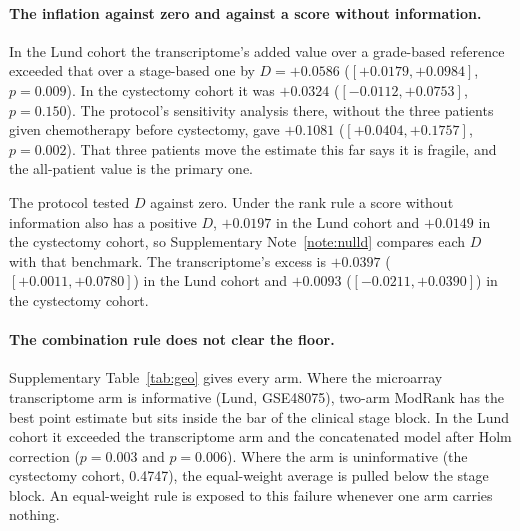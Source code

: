 \documentclass[11pt]{article}
\begin{document}
\paragraph{The inflation against zero and against a score without information.} In the Lund cohort
the transcriptome's added value over a grade-based reference exceeded that over a stage-based one by
$D=+0.0586$ ($[+0.0179, +0.0984]$, $p=0.009$). In the cystectomy cohort it was $+0.0324$
($[-0.0112, +0.0753]$, $p=0.150$). The protocol's sensitivity analysis there, without the three
patients given chemotherapy before cystectomy, gave $+0.1081$ ($[+0.0404, +0.1757]$, $p=0.002$).
That three patients move the estimate this far says it is fragile, and the all-patient value is the
primary one.

The protocol tested $D$ against zero. Under the rank rule a score without information
also has a positive $D$, $+0.0197$ in the Lund cohort and $+0.0149$ in the cystectomy cohort, so
Supplementary Note~\ref{note:nulld} compares each $D$ with that benchmark. The transcriptome's excess
is $+0.0397$ ($[+0.0011, +0.0780]$) in the Lund cohort and $+0.0093$ ($[-0.0211, +0.0390]$) in the
cystectomy cohort.

\paragraph{The combination rule does not clear the floor.} Supplementary Table~\ref{tab:geo} gives
every arm. Where the microarray transcriptome arm is informative (Lund, GSE48075), two-arm ModRank has
the best point estimate but sits inside the bar of the clinical stage block. In the Lund cohort it
exceeded the transcriptome arm and the concatenated model after Holm correction ($p=0.003$ and $p=0.006$).
Where the arm is uninformative (the cystectomy cohort, 0.4747), the equal-weight average is pulled
below the stage block. An equal-weight rule is exposed to this failure whenever one arm carries
nothing.
\end{document}
